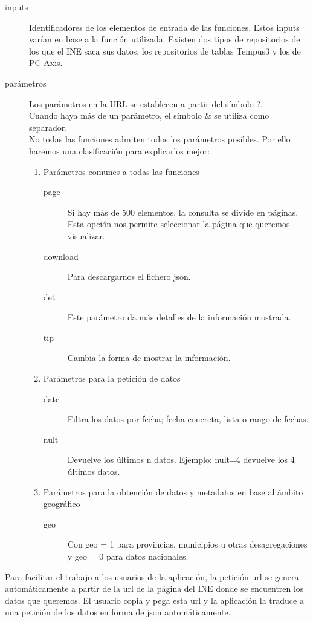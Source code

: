 \begin{description}
    \item [inputs] Identificadores de los elementos de entrada de las funciones. Estos inputs varían en base a la función utilizada.
    Existen dos tipos de repositorios de los que el INE saca sus datos; los repositorios de tablas Tempus3 y los de PC-Axis.
    \item [parámetros] Los parámetros en la URL se establecen a partir del símbolo ?.\\
    Cuando haya más de un parámetro, el símbolo \& se utiliza como separador.\\
    No todas las funciones admiten todos los parámetros posibles. Por ello haremos una clasificación para explicarlos mejor:  
     \begin{enumerate}
        \item Parámetros comunes a todas las funciones
            \begin{description}
            \item [page] Si hay más de 500 elementos, la consulta se divide en páginas. Esta opción nos permite seleccionar la página que queremos visualizar.
            \item [download] Para descargarnos el fichero json.
            \item [det] Este parámetro da más detalles de la información mostrada.
            \item [tip] Cambia la forma de mostrar la información.
            \end{description}
        \item Parámetros para la petición de datos
            \begin{description}
                \item [date] Filtra los datos por fecha; fecha concreta, lista o rango de fechas.
                \item [nult] Devuelve los últimos n datos. Ejemplo: nult=4 devuelve los 4 últimos datos.
            \end{description}
        \item Parámetros para la obtención de datos y metadatos en base al ámbito geográfico
            \begin{description}
                \item [geo] Con geo = 1 para provincias, municipios u otras desagregaciones y geo = 0 para datos nacionales.
            \end{description}
        \end{enumerate}
\end{description}
 Para facilitar el trabajo a los usuarios de la aplicación, la petición url se genera automáticamente a partir de la url de la página del INE donde se encuentren los datos que queremos.
 El usuario copia y pega esta url y la aplicación la traduce a una petición de los datos en forma de json automáticamente.

